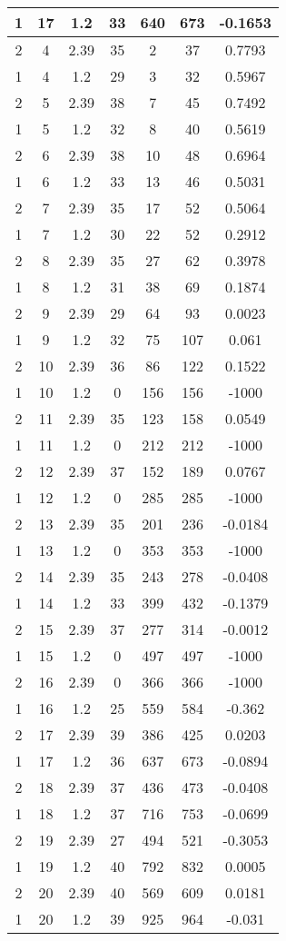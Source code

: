 \documentclass[letterpaper, 12pt]{article}
\begin{document}
\begin{longtable}{|c|c|c|c|c|c|c|}
\hline
1 & 17 & 1.2 & 33 & 640 & 673 & -0.1653 \\
\hline
2 & 4 & 2.39 & 35 & 2 & 37 & 0.7793 \\
\hline
1 & 4 & 1.2 & 29 & 3 & 32 & 0.5967 \\
\hline
2 & 5 & 2.39 & 38 & 7 & 45 & 0.7492 \\
\hline
1 & 5 & 1.2 & 32 & 8 & 40 & 0.5619 \\
\hline
2 & 6 & 2.39 & 38 & 10 & 48 & 0.6964 \\
\hline
1 & 6 & 1.2 & 33 & 13 & 46 & 0.5031 \\
\hline
2 & 7 & 2.39 & 35 & 17 & 52 & 0.5064 \\
\hline
1 & 7 & 1.2 & 30 & 22 & 52 & 0.2912 \\
\hline
2 & 8 & 2.39 & 35 & 27 & 62 & 0.3978 \\
\hline
1 & 8 & 1.2 & 31 & 38 & 69 & 0.1874 \\
\hline
2 & 9 & 2.39 & 29 & 64 & 93 & 0.0023 \\
\hline
1 & 9 & 1.2 & 32 & 75 & 107 & 0.061 \\
\hline
2 & 10 & 2.39 & 36 & 86 & 122 & 0.1522 \\
\hline
1 & 10 & 1.2 & 0 & 156 & 156 & -1000 \\
\hline
2 & 11 & 2.39 & 35 & 123 & 158 & 0.0549 \\
\hline
1 & 11 & 1.2 & 0 & 212 & 212 & -1000 \\
\hline
2 & 12 & 2.39 & 37 & 152 & 189 & 0.0767 \\
\hline
1 & 12 & 1.2 & 0 & 285 & 285 & -1000 \\
\hline
2 & 13 & 2.39 & 35 & 201 & 236 & -0.0184 \\
\hline
1 & 13 & 1.2 & 0 & 353 & 353 & -1000 \\
\hline
2 & 14 & 2.39 & 35 & 243 & 278 & -0.0408 \\
\hline
1 & 14 & 1.2 & 33 & 399 & 432 & -0.1379 \\
\hline
2 & 15 & 2.39 & 37 & 277 & 314 & -0.0012 \\
\hline
1 & 15 & 1.2 & 0 & 497 & 497 & -1000 \\
\hline
2 & 16 & 2.39 & 0 & 366 & 366 & -1000 \\
\hline
1 & 16 & 1.2 & 25 & 559 & 584 & -0.362 \\
\hline
2 & 17 & 2.39 & 39 & 386 & 425 & 0.0203 \\
\hline
1 & 17 & 1.2 & 36 & 637 & 673 & -0.0894 \\
\hline
2 & 18 & 2.39 & 37 & 436 & 473 & -0.0408 \\
\hline
1 & 18 & 1.2 & 37 & 716 & 753 & -0.0699 \\
\hline
2 & 19 & 2.39 & 27 & 494 & 521 & -0.3053 \\
\hline
1 & 19 & 1.2 & 40 & 792 & 832 & 0.0005 \\
\hline
2 & 20 & 2.39 & 40 & 569 & 609 & 0.0181 \\
\hline
1 & 20 & 1.2 & 39 & 925 & 964 & -0.031 \\
\hline
\end{longtable}
\end{document}
